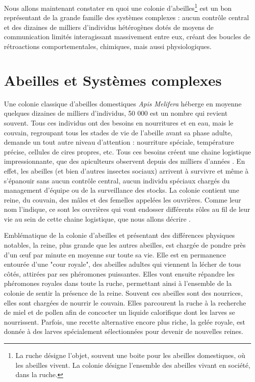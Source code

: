 			Nous allons maintenant constater en quoi une colonie d'abeilles\footnote{La ruche désigne l'objet, souvent une boite pour les abeilles domestiques, où les abeilles vivent. La colonie désigne l'ensemble des abeilles vivant en société, dans la ruche.} est un bon représentant de la grande famille des systèmes complexes : aucun contrôle central et des dizaines de milliers d'individus hétérogènes dotés de moyens de communication limités interagissant massivement entre eux, créant des boucles de rétroactions comportementales, chimiques, mais aussi physiologiques.
			
			

	
		\section{Abeilles et Systèmes complexes}	
		\label{sectionBio}	
			Une colonie classique d'abeilles domestiques \textit{Apis Melifera} héberge en moyenne quelques dizaines de milliers d'individus, 50 000 est un nombre qui revient souvent. Tous ces individus ont des besoins en nourritures et en eau, mais le couvain, regroupant tous les stades de vie de l'abeille avant sa phase adulte, demande un tout autre niveau d'attention : nourriture spéciale, température précise, cellules de cires propres, etc. Tous ces besoins créent une chaine logistique impressionnante, que des apiculteurs observent depuis des milliers d'années \cite{oldroyd_domestication_2012}. En effet, les abeilles (et bien d'autres insectes sociaux) arrivent à survivre et même à s'épanouir sans aucun contrôle central, aucun individu spéciaux chargés du management d'équipe ou de la surveillance des stocks. La colonie contient une reine, du couvain, des mâles et des femelles appelées les ouvrières. Comme leur nom l'indique, ce sont les ouvrières qui vont endosser différents rôles au fil de leur vie au sein de cette chaine logistique, que nous allons décrire \cite{winston_biology_1991, winston_role_1991, seeley_age_1991}. 
			
			Emblématique de la colonie d'abeilles et présentant des différences physiques notables, la reine, plus grande que les autres abeilles, est chargée de pondre près d'un œuf par minute en moyenne sur toute sa vie. Elle est en permanence entourée d'une "cour royale", des abeilles adultes qui viennent la lécher de tous côtés, attirées par ses phéromones puissantes. Elles vont ensuite répandre les phéromones royales dans toute la ruche, permettant ainsi à l'ensemble de la colonie de sentir la présence de la reine. Souvent ces abeilles sont des nourrices, elles sont chargées de nourrir le couvain. Elles parcourent la ruche à la recherche de miel et de pollen afin de concocter un liquide calorifique dont les larves se nourrissent. Parfois, une recette alternative encore plus riche, la gelée royale, est donnée à des larves spécialement sélectionnées pour devenir de nouvelles reines.
			
